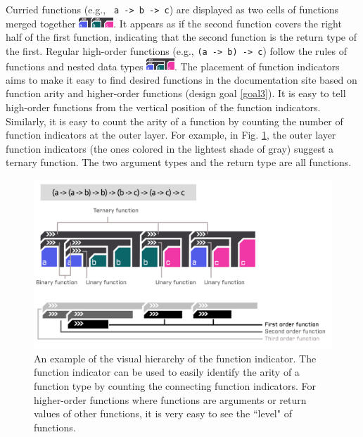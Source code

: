 \documentclass[preprint,12pt]{elsarticle}
\begin{document}
Curried functions (e.g., \texttt{ a -> b -> c}) are displayed as two cells of functions merged together \includegraphics[height=1em]{figures/Curry.png}. It appears as if the second function covers the right half of the first function, indicating that the second function is the return type of the first. Regular high-order functions (e.g., \texttt{(a -> b) -> c}) follow the rules of functions and nested data types \includegraphics[height=1.2em]{figures/HOF.png}. The placement of function indicators aims to make it easy to find desired functions in the documentation site based on function arity and higher-order functions (design goal \ref{goal3}). It is easy to tell high-order functions from the vertical position of the function indicators. Similarly, it is easy to count the arity of a function by counting the number of function indicators at the outer layer. For example, in Fig. \ref{fig:indicator}, the outer layer function indicators (the ones colored in the lightest shade of gray) suggest a ternary function. The two argument types and the return type are all functions.

\begin{figure}[h]
  \includegraphics[width=\linewidth]{figures/Indicator}
  \caption{
        \label{fig:indicator}
        An example of the visual hierarchy of the function indicator. The function indicator can be used to easily identify the arity of a function type by counting the connecting function indicators. For higher-order functions where functions are arguments or return values of other functions, it is very easy to see the ``level" of functions. 
  }
\end{figure}
\end{document}
